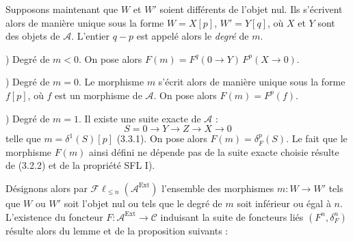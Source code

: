 Supposons maintenant que $W$ et $W'$ soient différents de l'objet nul. Ils
s'écrivent alors de manière unique sous la forme $W=X[p]$, $W'=Y[q]$, où
$X$ et $Y$ sont des objets de $\mathcal A$. L'entier $q-p$ est appelé alors
le \emph{degré} de $m$.

) Degré de $m<0$. On pose alors
$F(m)=F^q(0\longrightarrow Y)\,F^p(X\longrightarrow0)$.

) Degré de $m=0$. Le morphisme $m$ s'écrit alors de manière
unique sous la forme $f[p]$, où $f$ est un morphisme de $\mathcal A$. On
pose alors $F(m)=F^p(f)$.

) Degré de $m=1$. Il existe une suite exacte de $\mathcal A$ :
\[
S=0\longrightarrow Y\longrightarrow Z\longrightarrow X\longrightarrow0
\]
telle que $m=\delta^1(S)[p]$ (3.3.1). On pose alors
$F(m)=\delta_F^p(S)$. Le fait que le morphisme $F(m)$ ainsi défini ne
dépende pas de la suite exacte choisie résulte de (3.2.2) et de la propriété
SFL I).

Désignons alors par
$\mathcal{F}\ell_{\leq n}(\mathcal A^{\operatorname{Ext}})$ l'ensemble des
morphismes $m\colon W\longrightarrow W'$ tels que $W$ ou $W'$ soit l'objet
nul ou tels que le degré de $m$ soit inférieur ou égal à $n$. L'existence du
foncteur $F\colon\mathcal A^{\operatorname{Ext}}\longrightarrow\mathcal C$
induisant la suite de foncteurs liés $(F^n,\delta_F^n)$ résulte alors du
lemme et de la proposition suivants :
\endgroup
